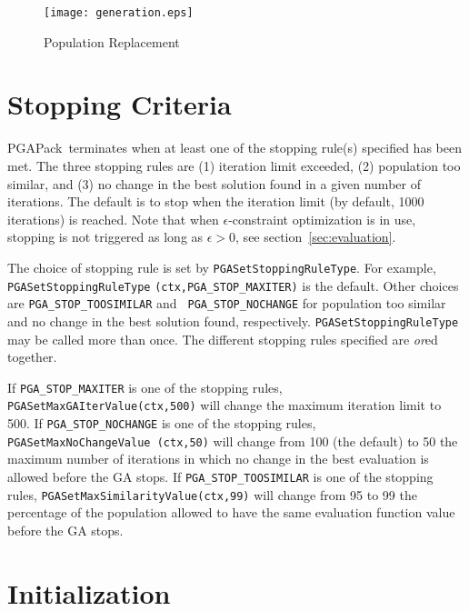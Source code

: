 \documentclass{report}
\newcommand{\pga}{PGAPack}
\begin{document}
\begin{figure}
\centerline{\texttt{[image: generation.eps]}}
\caption{Population Replacement}\label{fig:popreplace}
\end{figure}


\section{Stopping Criteria}\label{sec:stopping-criteria}

\pga\  terminates when at least one of the stopping
rule(s) specified has been met.  The three stopping rules are (1) iteration
limit exceeded, (2) population too similar, and (3) no change in the best
solution found in a given number of iterations.  The default is to stop when
the iteration limit (by default, 1000 iterations) is reached. Note that
when $\epsilon$-constraint optimization is in use, stopping is not
triggered as long as $\epsilon>0$, see section~\ref{sec:evaluation}.

\begin{sloppypar}
The choice of stopping rule is set by {\tt PGASetStoppingRuleType}.  For
example, {\tt PGASetStoppingRuleType} {\tt (ctx,PGA\_STOP\_MAXITER)} is the
default.  Other choices are {\tt PGA\_STOP\_TOOSIMILAR} and {\tt
PGA\_STOP\_NOCHANGE} for population too similar and no change in the best
solution found, respectively.  {\tt PGASetStoppingRuleType} may be called more
than once. The different stopping rules specified are {\em or}ed together.
\end{sloppypar}

If {\tt PGA\_STOP\_MAXITER} is one of the stopping rules, {\tt
PGASetMaxGAIterValue(ctx,500)} will change the maximum iteration limit to 500.
If {\tt PGA\_STOP\_NOCHANGE} is one of the stopping rules, {\tt
PGASetMaxNoChangeValue (ctx,50)} will change from 100 (the default) to 50 the
maximum number of iterations in which no change in the best evaluation is
allowed before the GA stops.  If {\tt PGA\_STOP\_TOOSIMILAR} is one of the
stopping rules, {\tt PGASetMaxSimilarityValue(ctx,99)} will change from 95 to
99 the percentage of the population allowed to have the same evaluation
function value before the GA stops.


\section{Initialization}\label{sec:initialization}
\end{document}
